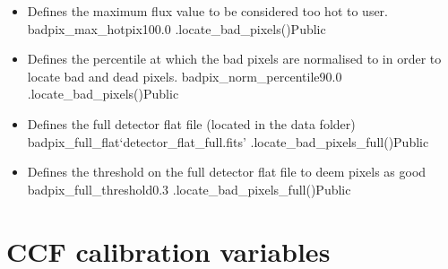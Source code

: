 \begin{itemize}
	\item {}
	{Defines the maximum flux value to be considered too hot to user.}
	{badpix\_max\_hotpix}{100.0}
	{\calbadpix}{\constantsfile}{\spirouImage.locate\_bad\_pixels()}{Public}

	\item {}
	{Defines the percentile at which the bad pixels are normalised to in order to locate bad and dead pixels.}
	{badpix\_norm\_percentile}{90.0}
	{\calbadpix}{\constantsfile}{\spirouImage.locate\_bad\_pixels()}{Public}


	\item {}
	{Defines the full detector flat file (located in the data folder)}
	{badpix\_full\_flat}{`detector\_flat\_full.fits'}
	{\calbadpix}{\constantsfile}{\spirouImage.locate\_bad\_pixels\_full()}{Public}

	\item {}
	{Defines the threshold on the full detector flat file to deem pixels as good}
	{badpix\_full\_threshold}{0.3}
	{\calbadpix}{\constantsfile}{\spirouImage.locate\_bad\_pixels\_full()}{Public}

\end{itemize}




\clearpage
\newpage
\section{CCF calibration variables}
\label{ch:variables:ccf}

